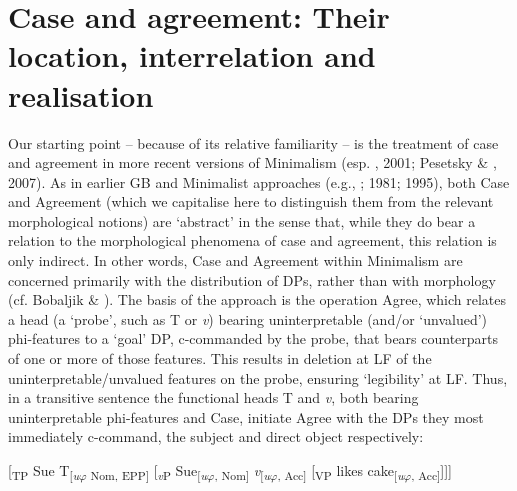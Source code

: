 \documentclass[output=paper]{langsci/langscibook}
\begin{document}
\section{Case and agreement: Their location, interrelation and realisation}
Our starting point – because of its relative familiarity – is the treatment of case and agreement in more recent versions of Minimalism (esp. \citealt{Chomsky2000}, 2001; Pesetsky \& \citealt{Torrego2001}, 2007). As in earlier GB and Minimalist approaches (e.g., \citealt{Chomsky1980}; 1981; 1995), both Case and Agreement (which we capitalise here to distinguish them from the relevant morphological notions) are ‘abstract’ in the sense that, while they do bear a relation to the morphological phenomena of case and agreement, this relation is only indirect. In other words, Case and Agreement within Minimalism are concerned primarily with the distribution of DPs, rather than with morphology (cf. Bobaljik \& \citealt{Wurmbrand2008}). The basis of the approach is the operation Agree, which relates a head (a ‘probe’, such as T or \textit{v}) bearing uninterpretable (and/or ‘unvalued’) phi-features to a ‘goal’ DP, c-commanded by the probe, that bears counterparts of one or more of those features. This results in deletion at LF of the uninterpretable/unvalued features on the probe, ensuring ‘legibility’ at LF. Thus, in a transitive sentence the functional heads T and \textit{v}, both bearing uninterpretable phi-features and Case, initiate Agree with the DPs they most immediately c-command, the subject and direct object respectively:

\ea%
    \label{ex:intro:1}
[\textsubscript{TP} Sue T\textsubscript{[}\textit{\textsubscript{u}}\textsubscript{$\varphi $ Nom, EPP]} [\textit{\textsubscript{v}}\textsubscript{P} Sue\textsubscript{[}\textit{\textsubscript{u}}\textsubscript{$\varphi $, Nom]} \textit{v}\textsubscript{[}\textit{\textsubscript{u}}\textsubscript{$\varphi $, Acc]} [\textsubscript{VP} likes cake\textsubscript{[}\textit{\textsubscript{u}}\textsubscript{$\varphi $, Acc]}]]]
    \z
 

 
\end{document}

